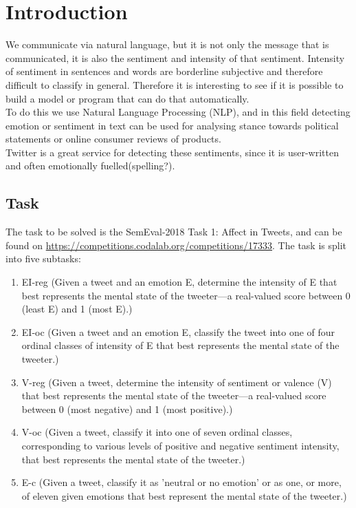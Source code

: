 \section{Introduction}
We communicate via natural language, but it is not only the message that is communicated, it is also the sentiment and intensity of that sentiment. Intensity of sentiment in sentences and words are borderline subjective and therefore difficult to classify in general. Therefore it is interesting to see if it is possible to build a model or program that can do that automatically. \\
To do this we use Natural Language Processing (NLP), and in this field detecting emotion or sentiment in text can be used for analysing stance towards political statements or online consumer reviews of products. \\
Twitter is a great service for detecting these sentiments, since it is user-written and often emotionally fuelled(spelling?).
\subsection{Task} \label{sec:task}
The task to be solved is the SemEval-2018 Task 1: Affect in Tweets, and can be found on \hyperref[https://competitions.codalab.org/competitions/17333]{https://competitions.codalab.org/competitions/17333}. The task is split into five subtasks:\\
\begin{enumerate}
\item EI-reg (Given a tweet and an emotion E, determine the  intensity of E that best represents the mental state of the tweeter—a real-valued score between 0 (least E) and 1 (most E).)
\item EI-oc (Given a tweet and an emotion E, classify the tweet into one of four ordinal classes of intensity of E that best represents the mental state of the tweeter.)
\item V-reg (Given a tweet, determine the intensity of sentiment or valence (V) that best represents the mental state of the tweeter—a real-valued score between 0 (most negative) and 1 (most positive).)
\item V-oc (Given a tweet, classify it into one of seven ordinal classes, corresponding to various levels of positive and negative sentiment intensity, that best represents the mental state of the tweeter.)
\item E-c (Given a tweet, classify it as 'neutral or no emotion' or as one, or more, of eleven given emotions that best represent the mental state of the tweeter.)
\end{enumerate}
 
